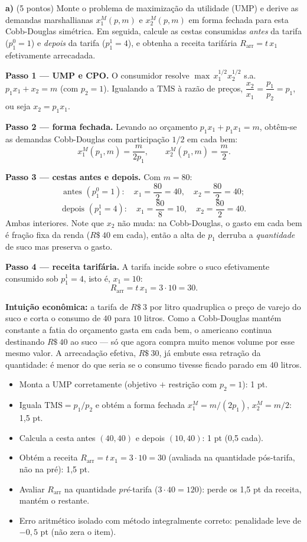\textbf{a)} (5 pontos) Monte o problema de maximização da utilidade (UMP) e derive as demandas marshallianas $x_1^{M}(p,m)$ e $x_2^{M}(p,m)$ em forma fechada para esta Cobb-Douglas simétrica. Em seguida, calcule as cestas consumidas \emph{antes} da tarifa ($p_1^{0}=1$) e \emph{depois} da tarifa ($p_1^{1}=4$), e obtenha a receita tarifária $R_{\text{arr}}=t\,x_1$ efetivamente arrecadada.
\resolucaobox{7.2cm}
\begin{solucao}
\textbf{Passo 1 --- UMP e CPO.} O consumidor resolve $\max\,x_1^{1/2}x_2^{1/2}$ s.a. $p_1x_1+x_2=m$ (com $p_2=1$). Igualando a $\text{TMS}$ à razão de preços, $\dfrac{x_2}{x_1}=\dfrac{p_1}{p_2}=p_1$, ou seja $x_2=p_1x_1$.

\textbf{Passo 2 --- forma fechada.} Levando ao orçamento $p_1x_1+p_1x_1=m$, obtêm-se as demandas Cobb-Douglas com participação $1/2$ em cada bem:
\[
x_1^{M}(p_1,m)=\frac{m}{2p_1},\qquad x_2^{M}(p_1,m)=\frac{m}{2}.
\]

\textbf{Passo 3 --- cestas antes e depois.} Com $m=80$:
\[
\text{antes }(p_1^{0}=1):\quad x_1=\frac{80}{2}=40,\quad x_2=\frac{80}{2}=40;
\]
\[
\text{depois }(p_1^{1}=4):\quad x_1=\frac{80}{8}=10,\quad x_2=\frac{80}{2}=40.
\]
Ambas interiores. Note que $x_2$ não muda: na Cobb-Douglas, o gasto em cada bem é fração fixa da renda ($R\$~40$ em cada), então a alta de $p_1$ derruba a \emph{quantidade} de suco mas preserva o gasto.

\textbf{Passo 4 --- receita tarifária.} A tarifa incide sobre o suco efetivamente consumido sob $p_1^{1}=4$, isto é, $x_1=10$:
\[
R_{\text{arr}}=t\,x_1=3\cdot 10=30.
\]

\textbf{Intuição econômica:} a tarifa de $R\$~3$ por litro quadruplica o preço de varejo do suco e corta o consumo de $40$ para $10$ litros. Como a Cobb-Douglas mantém constante a fatia do orçamento gasta em cada bem, o americano continua destinando $R\$~40$ ao suco --- só que agora compra muito menos volume por esse mesmo valor. A arrecadação efetiva, $R\$~30$, já embute essa retração da quantidade: é menor do que seria se o consumo tivesse ficado parado em $40$ litros.
\rubricalabel
\begin{itemize}
\item Monta a UMP corretamente (objetivo $+$ restrição com $p_2=1$): 1 pt.
\item Iguala $\text{TMS}=p_1/p_2$ e obtém a forma fechada $x_1^{M}=m/(2p_1)$, $x_2^{M}=m/2$: 1{,}5 pt.
\item Calcula a cesta antes $(40,40)$ e depois $(10,40)$: 1 pt (0{,}5 cada).
\item Obtém a receita $R_{\text{arr}}=t\,x_1=3\cdot 10=30$ (avaliada na quantidade pós-tarifa, não na pré): 1{,}5 pt.
\item Avaliar $R_{\text{arr}}$ na quantidade \emph{pré}-tarifa ($3\cdot 40=120$): perde os 1{,}5 pt da receita, mantém o restante.
\item Erro aritmético isolado com método integralmente correto: penalidade leve de $-0{,}5$ pt (não zera o item).
\end{itemize}
\end{solucao}

